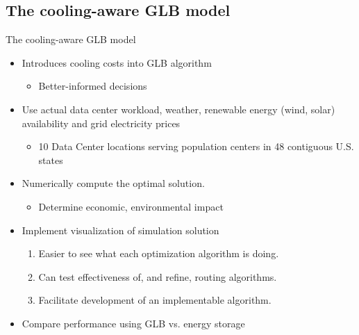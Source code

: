 \documentclass[xcolor=dvipsnames]{beamer}
\begin{document}
\subsection{The cooling-aware GLB model}
\begin{frame}{The cooling-aware GLB model}

		\begin{itemize}
			\item{Introduces cooling costs into GLB algorithm}
			\begin{itemize}
				\item Better-informed decisions  
			\end{itemize}
			\item{Use actual data center workload, weather, renewable energy (wind, solar) availability and grid electricity prices}
			\begin{itemize}
				\item {10 Data Center locations serving population centers in 48 contiguous U.S. states}		
			\end{itemize}
			\item{Numerically compute the optimal solution.}
			\begin{itemize}
				\item Determine economic, environmental impact
			\end{itemize}
			\item{Implement visualization of simulation solution \\
				\begin{enumerate}
					\item{Easier to see what each optimization algorithm is doing.}
					\item{Can test effectiveness of, and refine, routing algorithms.} 
					\item{Facilitate development of an implementable algorithm.}
				\end{enumerate}
				}			
			\item Compare performance using GLB vs. energy storage			
		\end{itemize}

\end{frame}
\end{document}

